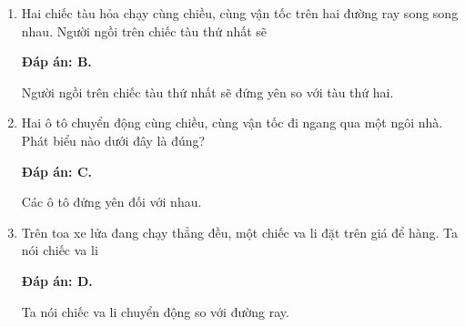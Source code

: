 \begin{enumerate}[label=\bfseries Câu \arabic*:]
{	}
	\item {}
	
	\cauhoi
	{Hai chiếc tàu hỏa chạy cùng chiều, cùng vận tốc trên hai đường ray song song nhau. Người ngồi trên chiếc tàu thứ nhất sẽ
		
	}
	
	\loigiai
	{\textbf{Đáp án: B.}
		
	Người ngồi trên chiếc tàu thứ nhất sẽ đứng yên so với tàu thứ hai.
		
	}
	
	\item {}
	
	\cauhoi
	{Hai ô tô chuyển động cùng chiều, cùng vận tốc đi ngang qua một ngôi nhà. Phát biểu nào dưới đây là đúng?
	}
	
	\loigiai
	{	\textbf{Đáp án: C.}
		
		Các ô tô đứng yên đối với nhau.
		
	}
	\item {}
	
	\cauhoi
	{Trên toa xe lửa đang chạy thẳng đều, một chiếc va li đặt trên giá để hàng. Ta nói chiếc va li
	}
	
	\loigiai
	{\textbf{Đáp án: D.}	
		
		Ta nói chiếc va li chuyển động so với đường ray.
		
}
\end{enumerate}
